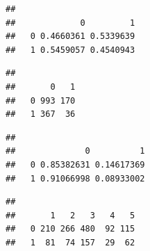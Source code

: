 \documentclass[
  10pt,
]{book}
\newenvironment{Shaded}{\begin{snugshade}}{\end{snugshade}}
\newcommand{\DecValTok}[1]{\textcolor[rgb]{0.00,0.00,0.81}{#1}}
\newcommand{\KeywordTok}[1]{\textcolor[rgb]{0.13,0.29,0.53}{\textbf{#1}}}
\newcommand{\NormalTok}[1]{#1}
\newcommand{\OperatorTok}[1]{\textcolor[rgb]{0.81,0.36,0.00}{\textbf{#1}}}
\begin{document}
\begin{verbatim}
##    
##             0         1
##   0 0.4660361 0.5339639
##   1 0.5459057 0.4540943
\end{verbatim}

\begin{Shaded}
\end{Shaded}

\begin{verbatim}
##    
##       0   1
##   0 993 170
##   1 367  36
\end{verbatim}

\begin{Shaded}
\end{Shaded}

\begin{verbatim}
##    
##              0          1
##   0 0.85382631 0.14617369
##   1 0.91066998 0.08933002
\end{verbatim}

\begin{Shaded}
\end{Shaded}

\begin{verbatim}
##    
##       1   2   3   4   5
##   0 210 266 480  92 115
##   1  81  74 157  29  62
\end{verbatim}

\begin{Shaded}
\end{Shaded}
\end{document}

